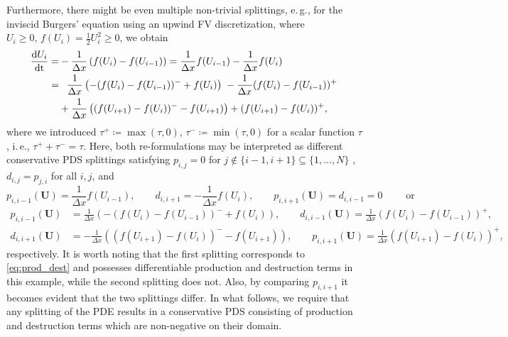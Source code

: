 \documentclass[final,11pt, times, linenumber, nopreprintline]{elsarticle}
\newcommand{\bU}{\bm U}
\begin{document}
\begin{rmk}
	Furthermore, there might be even multiple non-trivial splittings, e.\,g., for the inviscid Burgers' equation using an upwind FV discretization, where $U_i\geq 0, \,f(U_i)=\frac12 U_i^2 \geq 0$, we obtain
	\begin{equation*}
		\begin{aligned}
		\frac{\mathrm{d} U_i}{\mathrm{dt}} =&-\frac{1}{\Delta x}\left( f(U_{i})-f(U_{i-1})\right)	=
		\frac{1}{\Delta x}f(U_{i-1})-\frac{1}{\Delta x}f(U_i)\\
		=&\hphantom{+}\frac{1}{\Delta x}\left( -(f(U_{i})-f(U_{i-1}))^-+f(U_i)\right) \; -\frac{1}{\Delta x}(f(U_i)-f(U_{i-1}))^+\; \\
		&+\frac{1}{\Delta x}\left( (f(U_{i+1})-f(U_i))^-
		 -f(U_{i+1})\right) + (f(U_{i+1})-f(U_i))^+,
				\end{aligned}
	\end{equation*}
	where we introduced $\tau^+\coloneqq \max(\tau,0)$, $\tau^-\coloneqq \min(\tau,0)$ for a scalar function $\tau$, i.\,e., $\tau^++\tau^-=\tau$. Here, both re-formulations may be interpreted as different conservative PDS splittings satisfying $p_{i,j}=0$ for $j\notin\{i-1,i+1\}\subseteq\{1,\dotsc,N\}$ , $d_{i,j}=p_{j,i}$ for all $i,j$, and
	\begin{equation*}
		p_{i,i-1}(\bU)=\frac{1}{\Delta x}f(U_{i-1}),\qquad d_{i,i+1} = -\frac{1}{\Delta x}f(U_i) ,\qquad 	p_{i,i+1}(\bU)=d_{i,i-1}=0\qquad \text{ or }
		\end{equation*}
	\begin{align*}
		p_{i,i-1}(\bU)&=\frac{1}{\Delta x}\left( -(f(U_{i})-f(U_{i-1}))^-+f(U_i)\right),\qquad d_{i,i-1}(\bU)=\frac{1}{\Delta x}(f(U_i)-f(U_{i-1}))^+,\\
		d_{i,i+1}(\bU)&=-\frac{1}{\Delta x}\left( (f(U_{i+1})-f(U_i))^-
		 -f(U_{i+1})\right), \qquad p_{i,i+1}(\bU)= \frac{1}{\Delta x}(f(U_{i+1})-f(U_i))^+,
	\end{align*}
	respectively.
	It is worth noting that the first splitting corresponds to \eqref{eq:prod_dest} and possesses differentiable production and destruction terms in this example, while the second splitting does not. Also, by comparing $p_{i,i+1}$ it becomes evident that the two splittings differ. In what follows, we require that any splitting of the PDE results in a conservative PDS consisting of production and destruction terms which are non-negative on their domain.

\end{rmk}
\end{document}
